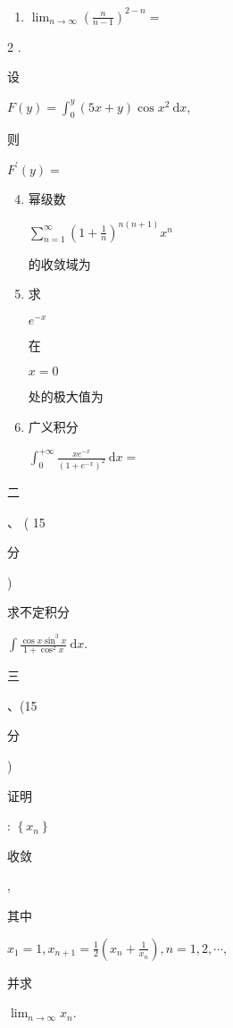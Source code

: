 \documentclass[10pt]{article}
\begin{document}
\begin{enumerate}
  \item $\lim _{n \rightarrow \infty}\left(\frac{n}{n-1}\right)^{2-n}=$
\end{enumerate}
2 . \begin{CJK}{UTF8}{mj}设\end{CJK} $F(y)=\int_{0}^{y}(5 x+y) \cos x^{2} \mathrm{~d} x$, \begin{CJK}{UTF8}{mj}则\end{CJK} $F^{\prime}(y)=$

\begin{enumerate}
  \setcounter{enumi}{3}
  \item \begin{CJK}{UTF8}{mj}幂级数\end{CJK} $\sum_{n=1}^{\infty}\left(1+\frac{1}{n}\right)^{n(n+1)} x^{n}$ \begin{CJK}{UTF8}{mj}的收敛域为\end{CJK}

  \item \begin{CJK}{UTF8}{mj}求\end{CJK} $e^{-x}$ \begin{CJK}{UTF8}{mj}在\end{CJK} $x=0$ \begin{CJK}{UTF8}{mj}处的极大值为\end{CJK}

  \item \begin{CJK}{UTF8}{mj}广义积分\end{CJK} $\int_{0}^{+\infty} \frac{x e^{-x}}{\left(1+e^{-x}\right)^{2}} \mathrm{~d} x=$

\end{enumerate}
\begin{CJK}{UTF8}{mj}二\end{CJK}、 ( 15 \begin{CJK}{UTF8}{mj}分\end{CJK}) \begin{CJK}{UTF8}{mj}求不定积分\end{CJK} $\int \frac{\cos x \sin ^{3} x}{1+\cos ^{2} x} \mathrm{~d} x$.

\begin{CJK}{UTF8}{mj}三\end{CJK}、(15 \begin{CJK}{UTF8}{mj}分\end{CJK}) \begin{CJK}{UTF8}{mj}证明\end{CJK}: $\left\{x_{n}\right\}$ \begin{CJK}{UTF8}{mj}收敛\end{CJK}, \begin{CJK}{UTF8}{mj}其中\end{CJK} $x_{1}=1, x_{n+1}=\frac{1}{2}\left(x_{n}+\frac{1}{x_{n}}\right), n=1,2, \cdots$, \begin{CJK}{UTF8}{mj}并求\end{CJK} $\lim _{n \rightarrow \infty} x_{n}$.
\end{document}
